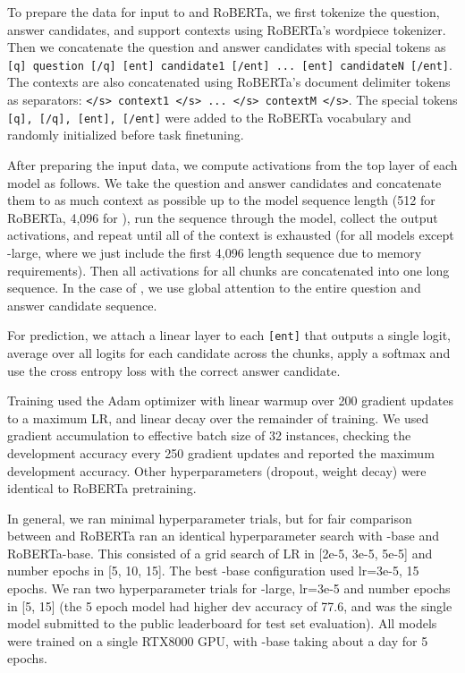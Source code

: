 To prepare the data for input to \model and RoBERTa, we first tokenize the question, answer candidates, and support contexts using RoBERTa's wordpiece tokenizer.  Then we concatenate the question and answer candidates with special tokens as \texttt{[q] question [/q] [ent] candidate1 [/ent] ... [ent] candidateN [/ent]}.  The contexts are also concatenated using RoBERTa's document delimiter tokens as separators: \texttt{</s> context1 </s> ... </s> contextM </s>}.  The special tokens \texttt{[q], [/q], [ent], [/ent]} were added to the RoBERTa vocabulary and randomly initialized before task finetuning.

After preparing the input data, we compute activations from the top layer of each model as follows.
We take the question and answer candidates and concatenate them to as much context as possible up to the model sequence length (512 for RoBERTa, 4,096 for \model), run the sequence through the model, collect the output activations, and repeat until all of the context is exhausted (for all models except \model-large, where we just include the first 4,096 length sequence due to memory requirements).  Then all activations for all chunks are concatenated into one long sequence.  In the case of \model, we use global attention to the entire question and answer candidate sequence.

For prediction, we attach a linear layer to each \texttt{[ent]} that outputs a single logit, average over all logits for each candidate across the chunks, apply a softmax and use the cross entropy loss with the correct answer candidate.

Training used the Adam optimizer with linear warmup over 200 gradient updates to a maximum LR, and linear decay over the remainder of training.  We used gradient accumulation to effective batch size of 32 instances, checking the development accuracy every 250 gradient updates and reported the maximum development accuracy.  Other hyperparameters (dropout, weight decay) were identical to RoBERTa pretraining.

In general, we ran minimal hyperparameter trials, but for fair comparison between \model and RoBERTa ran an identical hyperparameter search with \model-base and RoBERTa-base.  This consisted of a grid search of LR in [2e-5, 3e-5, 5e-5] and number epochs in [5, 10, 15].  The best \model-base configuration used lr=3e-5, 15 epochs.  We ran two hyperparameter trials for \model-large, lr=3e-5 and number epochs in [5, 15] (the 5 epoch model had higher dev accuracy of 77.6, and was the single model submitted to the public leaderboard for test set evaluation).  All models were trained on a single RTX8000 GPU, with \model-base taking about a day for 5 epochs.

